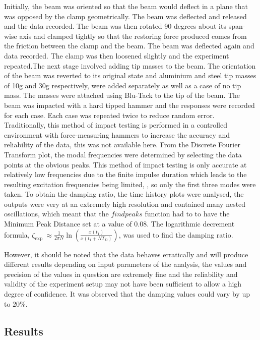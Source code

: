 \documentclass[11pt]{article}
\begin{document}
Initially, the beam was oriented so that the beam would deflect in a plane that was opposed by the clamp geometrically. The beam was deflected and released and the data recorded. The beam was then rotated 90 degrees about its span-wise axis and clamped tightly so that the restoring force produced comes from the friction between the clamp and the beam. The beam was deflected again and data recorded. The clamp was then loosened slightly and the experiment repeated.The next stage involved adding tip masses to the beam.
The orientation of the beam was reverted to its original state and aluminium and steel tip masses of 10g and 30g respectively, were added separately as well as a case of no tip mass. The masses were attached using Blu-Tack to the tip of the beam. The beam was impacted with a hard tipped hammer and the responses were recorded for each case.
Each case was repeated twice to reduce random error. Traditionally, this method of impact testing is performed in a controlled environment with force-measuring hammers to increase the accuracy and reliability of the data, this was not available here.
From the Discrete Fourier Transform plot, the modal frequencies were determined by selecting the data points at the obvious peaks. This method of impact testing is only accurate at relatively low frequencies due to the finite impulse duration which leads to the resulting excitation frequencies being limited, \cite{brano1}, so only the first three modes were taken.
To obtain the damping ratio, the time history plots were analysed, the outputs were very at an extremely high resolution and contained many nested oscillations, which meant that the $findpeaks$ function had to to have the Minimum Peak Distance set at a value of 0.08. The logarithmic decrement formula, $\zeta_{\text {exp }} \approx \frac{1}{2 \pi N} \ln \left(\frac{x\left(t_{1}\right)}{x\left(t_{1}+N T_{D}\right)}\right) \label{eq:logdec}$, was used to find the damping ratio.

However, it should be noted that the data behaves erratically and will produce different results depending on input parameters of the analysis, the values and precision of the values in question are extremely fine and the reliability and validity of the experiment setup may not have been sufficient to allow a high degree of confidence. It was observed that the damping values could vary by up to $20\%$.

\subsection{Results}
\end{document}
